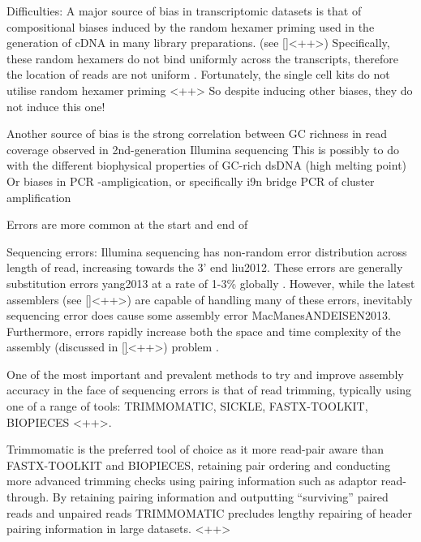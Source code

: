 


Difficulties: 
A major source of bias in transcriptomic datasets is that of compositional biases induced
by the random hexamer priming used in the generation of cDNA in many library preparations.
(see \ref{}<++>) %
Specifically, these random hexamers do not bind uniformly across the transcripts,
therefore the location of reads are not uniform \citep{Hansen2010}\citep{Hansen2010}.
Fortunately, the single cell kits do not utilise random hexamer priming {}<++> %
So despite inducing other biases, they do not induce this one!


Another source of bias is the strong correlation between GC richness in read coverage
observed in 2nd-generation Illumina sequencing \citep{Dohm2008,}
This is possibly to do with the different biophysical properties of GC-rich dsDNA (high melting point) \citep{Dohm2008} %
Or biases in PCR -ampligication, or specifically i9n bridge PCR of cluster amplification


Errors are more common at the start and end of 




Sequencing errors: Illumina sequencing has non-random error distribution across length of read, increasing towards the 3' end liu2012. These errors are generally substitution errors yang2013 at a rate of 1-3\% globally \citep{MacManes2014}.  However, while the latest assemblers (see \ref{}<++>) are capable of %
handling many of these errors, inevitably sequencing error does cause some
assembly error MacManesANDEISEN2013.
Furthermore, errors rapidly increase both the space and time complexity of the assembly (discussed in \ref{}<++>) problem \citep{MacManes2014}.

One of the most important and prevalent methods to try and improve assembly
accuracy in the face of sequencing errors is that of read trimming, typically
using one of a range of tools: TRIMMOMATIC, SICKLE, FASTX-TOOLKIT, BIOPIECES \citep{}<++>. %

Trimmomatic is the preferred tool of choice as it more read-pair aware than
FASTX-TOOLKIT and BIOPIECES, retaining pair ordering and conducting more
advanced trimming checks using pairing information such as adaptor read-through.
By retaining pairing information and outputting ``surviving'' paired reads and
unpaired reads TRIMMOMATIC precludes lengthy repairing of header pairing information
in large datasets. \citep{}<++> %

